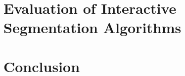 \documentclass[runningheads,a4paper]{llncs}
\begin{document}
\section{Evaluation of Interactive Segmentation Algorithms}


\section{Conclusion}






\end{document}
